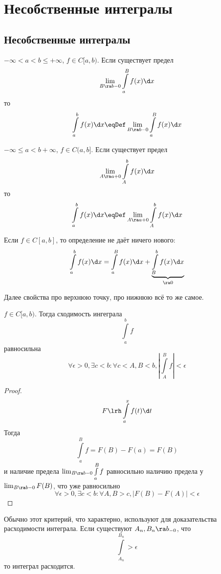 \chapter{Несобственные интегралы}

\section{Несобственные интегралы}

\begin{Def}
	$-\infty < a < b \le +\infty$, $f \in C[a,b)$.
	Если существует предел
	\[ \lim_{B \ra b-0} \int\limits_a^B f(x) \d x \]
	то
	\[ \int\limits_a^b f(x) \d x \eqDef \lim_{B \ra b-0} \int\limits_a^B f(x) \d x \]
\end{Def}

\begin{Def}
	$-\infty \le a < b +\infty$, $f \in C(a,b]$.
	Если существует предел
	\[ \lim_{A \ra a+0} \int\limits_A^b f(x) \d x \]
	то
	\[ \int\limits_a^b f(x) \d x \eqDef \lim_{A \ra a+0} \int\limits_A^b f(x) \d x \]
\end{Def}

\begin{Rem}
	Если $f \in C[a, b]$, то определение не даёт ничего нового:
	\[ \int\limits_a^b f(x) \d x = \int\limits_a^B f(x) \d x + \underbrace{\int\limits_B^b f(x) \d x}_{\ra0} \]
\end{Rem}

Далее свойства про верхнюю точку, про нижнюю всё то же самое.

\begin{theorem}
	$f \in C[a, b)$. Тогда сходимость ингеграла
	\[ \int\limits_a^b f \]
	равносильна
	\[ \forall \epsilon > 0, \exists c < b\colon \forall c < A, B < b, \left|\int\limits_A^B f\right| < \epsilon \]
\end{theorem}
\begin{proof}
	\[ F \lrh \int\limits_a^x f(t) \d t \]
	Тогда
	\[ \int\limits_a^B f = F(B) - F(a) = F(B) \]
	и наличие предела $\lim_{B \ra b-0} \int\limits_a^B f$ равносильно наличию предела у $\lim_{B \ra b-0} F(B)$,
	что уже равносильно
	\[ \forall \epsilon > 0, \exists c < b\colon \forall A, B > c, |F(B) - F(A)| < \epsilon \]
\end{proof}

\begin{Rem}
	Обычно этот критерий, что характерно, используют для доказательства расходимости интеграла.
	Если существуют $A_n, B_n \ra b_{-0}$, что
	\[ \int\limits_{A_n}^{B_n} > \epsilon \]
	то интеграл расходится.
\end{Rem}

